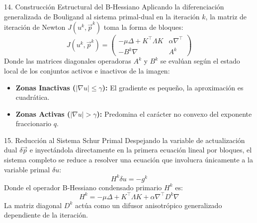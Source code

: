 \documentclass[aspectratio=169,11pt]{beamer}
\begin{document}
\begin{frame}{14. Construcción Estructural del B-Hessiano}
    Aplicando la diferenciación generalizada de Bouligand al sistema primal-dual en la iteración $k$, la matriz de iteración de Newton $J(u^k, \vec{p}^k)$ toma la forma de bloques:
    \begin{equation}
        J(u^k, \vec{p}^k) = \begin{pmatrix}
            -\mu \Delta + K^\top \Lambda K & \alpha \nabla^\top \\
            -B^k \nabla & A^k
        \end{pmatrix}
    \end{equation}
    Donde las matrices diagonales operadoras $A^k$ y $B^k$ se evalúan según el estado local de los conjuntos activos e inactivos de la imagen:
    \begin{itemize}
        \item \textbf{Zonas Inactivas ($|\nabla u| \le \gamma$):} El gradiente es pequeño, la aproximación es cuadrática.
        \item \textbf{Zonas Activas ($|\nabla u| > \gamma$):} Predomina el carácter no convexo del exponente fraccionario $q$.
    \end{itemize}
\end{frame}

\begin{frame}{15. Reducción al Sistema Schur Primal}
    Despejando la variable de actualización dual $\delta \vec{p}$ e inyectándola directamente en la primera ecuación lineal por bloques, el sistema completo se reduce a resolver una ecuación que involucra únicamente a la variable primal $\delta u$:
    \begin{equation}
        H^k \delta u = -g^k
    \end{equation}
    Donde el operador B-Hessiano condensado primario $H^k$ es:
    \begin{equation}
        H^k = -\mu \Delta + K^\top \Lambda K + \alpha \nabla^\top D^k \nabla
    \end{equation}
    La matriz diagonal $D^k$ actúa como un difusor anisotrópico generalizado dependiente de la iteración.
\end{frame}
\end{document}
